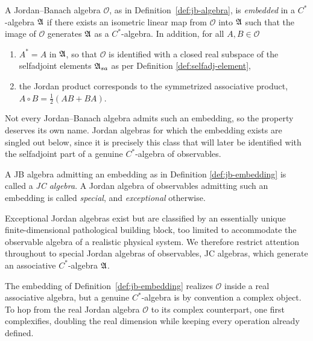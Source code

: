\begin{definition}\label{def:jb-embedding}
	A Jordan--Banach algebra $\mathcal{O}$, as in Definition~\ref{def:jb-algebra},
	is \emph{embedded} in a $C^*$-algebra $\mathfrak{A}$ if there exists an isometric linear map from $\mathcal{O}$ into $\mathfrak{A}$ such that the image of $\mathcal{O}$ generates $\mathfrak{A}$ as a $C^*$-algebra. In addition, for all $A,B\in\mathcal{O}$
	\begin{enumerate}
		\item $A^* = A$ in $\mathfrak{A}$, so that $\mathcal{O}$ is identified with a closed real subspace of the selfadjoint elements $\mathfrak{A}_{sa}$ as per Definition \ref{def:selfadj-element},
		\item the Jordan product corresponds to the symmetrized associative product, $A\circ B=\tfrac12(AB+BA)$.
	\end{enumerate}
\end{definition}

Not every Jordan--Banach algebra admits such an embedding, so the property
deserves its own name. Jordan algebras for which the embedding exists are
singled out below, since it is precisely this class that will later be
identified with the selfadjoint part of a genuine $C^*$-algebra of
observables.

\begin{definition}[JC algebra]\label{def:jc-algebra}
	A JB algebra admitting an embedding as in Definition \ref{def:jb-embedding} is called a \emph{JC algebra}. A
	Jordan algebra of observables admitting such an embedding is called
	\emph{special}, and \emph{exceptional} otherwise.
\end{definition}

\begin{remark}
	Exceptional Jordan algebras exist but are classified by an essentially
	unique finite-dimensional pathological building block, too limited to
	accommodate the observable algebra of a realistic physical system. We
	therefore restrict attention throughout to special Jordan algebras of
	observables, JC algebras, which generate an associative
	$C^*$-algebra $\mathfrak{A}$.
\end{remark}

The embedding of Definition~\ref{def:jb-embedding} realizes $\mathcal{O}$
inside a real associative algebra, but a genuine $C^*$-algebra is by
convention a complex object. To hop from the real Jordan algebra
$\mathcal{O}$ to its complex counterpart, one first complexifies, doubling
the real dimension while keeping every operation already defined.

